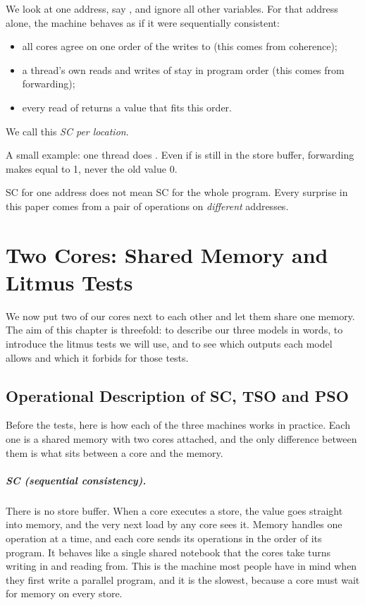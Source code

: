 We look at one address, say , and ignore all other variables. For that address alone, the machine behaves as if it were sequentially consistent:
\begin{itemize}
  \item all cores agree on one order of the writes to  (this comes from coherence);
  \item a thread's own reads and writes of  stay in program order (this comes from forwarding);
  \item every read of  returns a value that fits this order.
\end{itemize}
We call this \emph{SC per location}\cite{alglave2014}.

A small example: one thread does . Even if  is still in the store buffer, forwarding makes  equal to 1, never the old value 0.

\begin{notebox}
SC for one address does not mean SC for the whole program. Every surprise in this paper comes from a pair of operations on \emph{different} addresses.
\end{notebox}

\chapter{Two Cores: Shared Memory and Litmus Tests}
\label{ch:litmus}

We now put two of our cores next to each other and let them share one memory. The aim of this chapter is threefold: to describe our three models in words, to introduce the litmus tests we will use, and to see which outputs each model allows and which it forbids for those tests.

\section{Operational Description of SC, TSO and PSO}
\label{sec:models-words}

Before the tests, here is how each of the three machines works in practice. Each one is a shared memory with two cores attached, and the only difference between them is what sits between a core and the memory.

\paragraph{SC (sequential consistency).} There is no store buffer. When a core executes a store, the value goes straight into memory, and the very next load by any core sees it. Memory handles one operation at a time, and each core sends its operations in the order of its program. It behaves like a single shared notebook that the cores take turns writing in and reading from. This is the machine most people have in mind when they first write a parallel program, and it is the slowest, because a core must wait for memory on every store.

